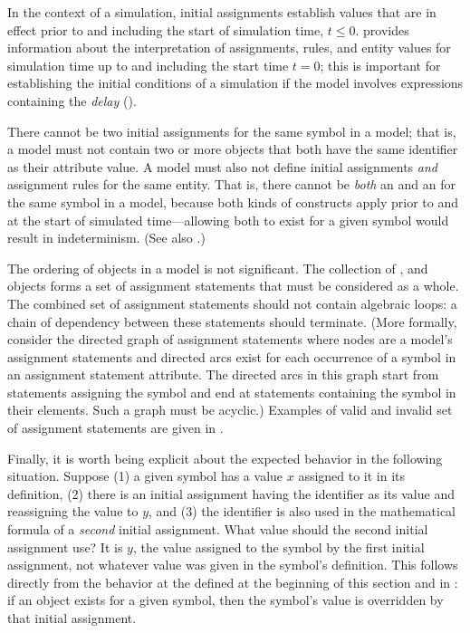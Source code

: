 In the context of a simulation, initial assignments establish
values that are in effect prior to and including the start of
simulation time, \ie $t \leq 0$.  
provides information about the interpretation of assignments,
rules, and entity values for simulation time up to and including
the start time $t = 0$; this is important for establishing the
initial conditions of a simulation if the model involves
expressions containing the \emph{delay} 
().

There cannot be two initial assignments for the same symbol in a
model; that is, a model must not contain two or more
\InitialAssignment objects that both have the same identifier as
their  attribute value.  A model must also not define
initial assignments \emph{and} assignment rules for the same
entity.  That is, there cannot be \emph{both} an
\InitialAssignment and an \AssignmentRule for the same symbol in a
model, because both kinds of constructs apply prior to and at the
start of simulated time---allowing both to exist for a given
symbol would result in indeterminism.  (See also
.)

The ordering of \InitialAssignment objects in a model is not
significant.  The collection of \InitialAssignment,
\AssignmentRule and \KineticLaw objects forms a set of assignment
statements that must be considered as a whole.  The combined set
of assignment statements should not contain algebraic loops: a
chain of dependency between these statements should terminate.
(More formally, consider the directed graph of assignment
statements where nodes are a model's assignment statements and
directed arcs exist for each occurrence of a symbol in an
assignment statement  attribute.  The directed arcs in
this graph start from statements assigning the symbol and end at
statements containing the symbol in their  elements.
Such a graph must be acyclic.) Examples of valid and invalid set
of assignment statements are given in
.

Finally, it is worth being explicit about the expected behavior in
the following situation.  Suppose (1) a given symbol has a value
$x$ assigned to it in its definition, (2) there is an initial
assignment having the identifier as its  value and
reassigning the value to $y$, and (3) the identifier is
also used in the mathematical formula of a \emph{second} initial
assignment.  What value should the second initial assignment use?
It is $y$, the value assigned to the symbol by the first initial
assignment, not whatever value was given in the symbol's
definition.  This follows directly from the behavior at the
defined at the beginning of this section and in
: if an \InitialAssignment object
exists for a given symbol, then the symbol's value is overridden
by that initial assignment.


